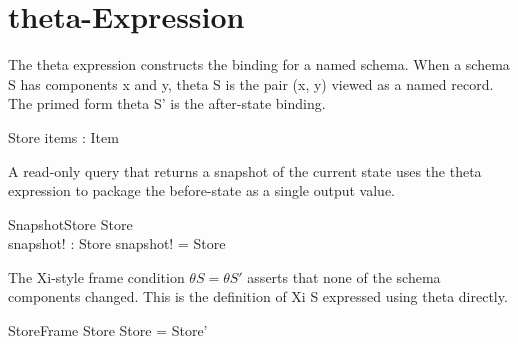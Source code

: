 \documentclass[a4paper,10pt,fleqn]{article}
\begin{document}
\section*{theta-Expression}

\noindent The theta expression constructs the binding for a named schema.  When a schema S has components x and y, theta S is the pair (x, y) viewed as a named record.  The primed form theta S' is the after-state binding.

\bigskip

\begin{zed}
[Item]
\end{zed}

\begin{schema}{Store}
items : \power Item
\end{schema}

\noindent A read-only query that returns a snapshot of the current state uses the theta expression to package the before-state as a single output value.

\bigskip

\begin{schema}{SnapshotStore}
\Xi Store \\
snapshot! : Store
\where
snapshot! = \theta Store
\end{schema}

\noindent The Xi-style frame condition $\theta S = \theta S'$ asserts that none of the schema components changed.  This is the definition of Xi S expressed using theta directly.

\bigskip

\begin{schema}{StoreFrame}
\Xi Store
\where
\theta Store = \theta Store'
\end{schema}
\end{document}
